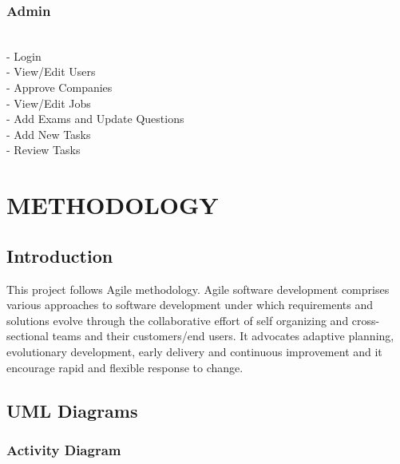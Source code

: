 \documentclass[a4paper,12pt]{report}
\begin{document}
\subsection{Admin}

\subitem
\\ - Login
\\ - View/Edit Users
\\ - Approve Companies
\\ - View/Edit Jobs
\\ - Add Exams and Update Questions
\\ - Add New Tasks
\\ - Review Tasks

\pagebreak



\chapter{METHODOLOGY}

\section{Introduction}
\hspace*{12pt}This project follows Agile methodology. Agile software development comprises various approaches to software development under which requirements and solutions evolve through the collaborative effort of self organizing and cross-sectional teams and their customers/end users. It advocates
adaptive planning, evolutionary development, early delivery and continuous improvement and it encourage rapid and flexible response to change.
\newpage
\section{UML Diagrams}

\subsection{Activity Diagram}
\vspace*{12pt}
\end{document}
